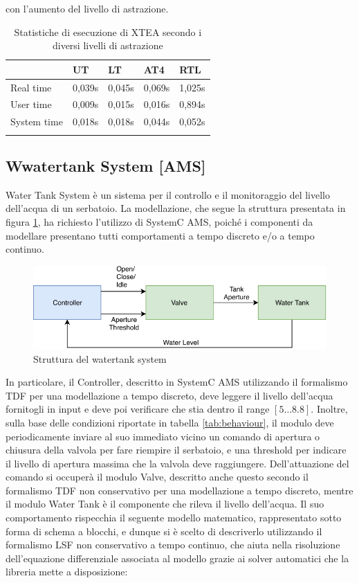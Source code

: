 \documentclass[]{IEEEtran}
\begin{document}
con l'aumento del livello di astrazione.
\begin{table}[]
    \centering
    \begin{tabular}{lllll}
    \toprule
                & UT     & LT     & AT4    & RTL    \\ \hline
    Real time   & 0,039s & 0,045s & 0,069s & 1,025s \\
    User time   & 0,009s & 0,015s & 0,016s & 0,894s \\
    System time & 0,018s & 0,018s & 0,044s & 0,052s \\ \bottomrule
    \\
    \end{tabular}
    \caption{Statistiche di esecuzione di XTEA secondo i diversi livelli di astrazione}
    \label{tab:time}
\end{table}

\subsection{Wwatertank System [AMS]}

Water Tank System è un sistema per il controllo e il monitoraggio del livello dell'acqua di un serbatoio. La modellazione,
che segue la struttura presentata in figura \ref{fig:continuous_system}, ha richiesto l'utilizzo di SystemC AMS, poich\'e 
i componenti da modellare presentano tutti comportamenti a tempo discreto e/o a tempo continuo.
\begin{figure}[bt]
	\centering
	\includegraphics[width=\columnwidth]{figures/countinous_system.pdf}
	\caption{Struttura del watertank system}
	\label{fig:continuous_system}
\end{figure}
In particolare, il Controller, descritto in SystemC AMS utilizzando il formalismo TDF per una modellazione a tempo discreto, 
deve leggere il livello dell'acqua fornitogli in input e deve poi verificare che stia dentro il range $[5 \dots 8.8]$. 
Inoltre, sulla base delle condizioni riportate in tabella \ref{tab:behaviour}, il modulo deve periodicamente inviare al 
suo immediato vicino un comando di apertura o chiusura della valvola per fare riempire il serbatoio, e una threshold per 
indicare il livello di apertura massima che la valvola deve raggiungere. Dell'attuazione del comando si occuper\`a il 
modulo Valve, descritto anche questo secondo il formalismo TDF non conservativo per una modellazione a tempo discreto, 
mentre il modulo Water Tank è il componente che rileva il livello dell'acqua. Il suo comportamento rispecchia il seguente 
modello matematico, rappresentato sotto forma di schema a blocchi, e dunque si è scelto di descriverlo utilizzando 
il formalismo LSF non conservativo a tempo continuo, che aiuta nella risoluzione dell'equazione differenziale associata 
al modello grazie ai solver automatici che la libreria mette a disposizione:\\
\end{document}
